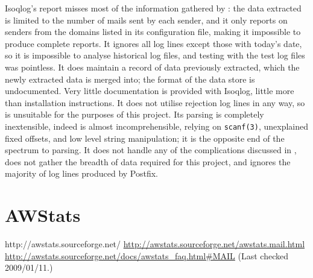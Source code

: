 Isoqlog's report misses most of the information gathered by \parsername{}:
the data extracted is limited to the number of mails sent by each sender,
and it only reports on senders from the domains listed in its configuration
file, making it impossible to produce complete reports.  It ignores all log
lines except those with today's date, so it is impossible to analyse
historical log files, and testing with the \numberOFlogFILES{} test log
files was pointless.  It does maintain a record of data previously
extracted, which the newly extracted data is merged into; the format of the
data store is undocumented.  Very little documentation is provided with
Isoqlog, little more than installation instructions.  It does not utilise
rejection log lines in any way, so is unsuitable for the purposes of this
project.  Its parsing is completely inextensible, indeed is almost
incomprehensible, relying on \texttt{scanf(3)}, unexplained fixed offsets,
and low level string manipulation; it is the opposite end of the spectrum
to \parsernames{} parsing.  It does not handle any of the complications
discussed in , does not gather the breadth of
data required for this project, and ignores the majority of log lines
produced by Postfix.

\section{AWStats}

{http://awstats.sourceforge.net/}
\url{http://awstats.sourceforge.net/awstats.mail.html} \newline{}
\url{http://awstats.sourceforge.net/docs/awstats_faq.html#MAIL} \newline{}
(Last checked 2009/01/11.)

